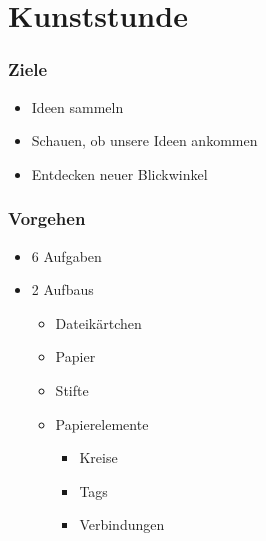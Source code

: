 \section{Kunststunde}
\label{kunststunde}

\begin{frame}

\frametitle{Ziele}
\label{ziele}

\begin{itemize}
\item Ideen sammeln

\item Schauen, ob unsere Ideen ankommen

\item Entdecken neuer Blickwinkel

\end{itemize}

\end{frame}

\begin{frame}

\frametitle{Vorgehen}
\label{vorgehen}

\begin{itemize}
\item 6 Aufgaben

\item 2 Aufbaus

\begin{itemize}
\item Dateikärtchen

\item Papier

\item Stifte

\item Papierelemente

\begin{itemize}
\item Kreise

\item Tags

\item Verbindungen

\end{itemize}

\end{itemize}

\end{itemize}

\end{frame}

